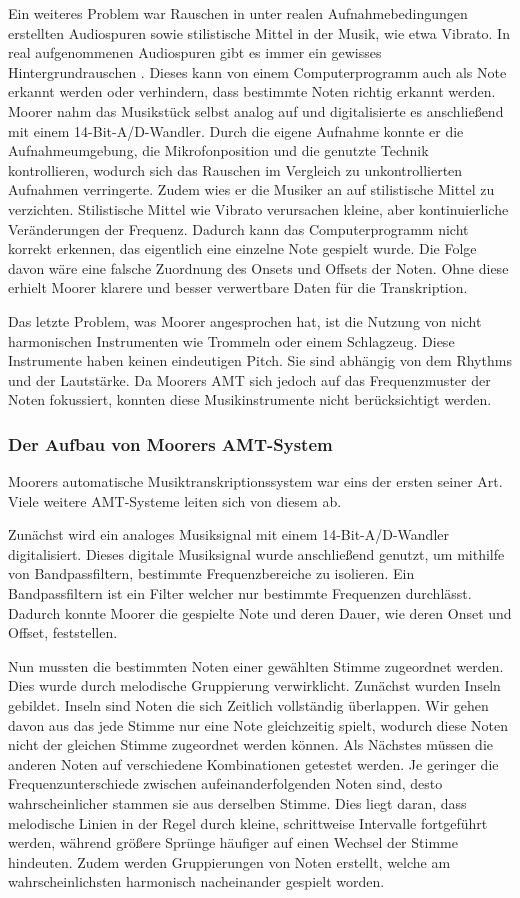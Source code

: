 Ein weiteres Problem war Rauschen in unter realen Aufnahmebedingungen erstellten Audiospuren
sowie stilistische Mittel in der Musik, wie etwa Vibrato.
In real aufgenommenen Audiospuren gibt es immer ein gewisses Hintergrundrauschen \cite{iZotope2025noisefloor}.
Dieses kann von einem Computerprogramm auch als Note erkannt werden oder verhindern,
dass bestimmte Noten richtig erkannt werden.
Moorer nahm das Musikstück selbst analog auf und digitalisierte es anschließend mit einem 14-Bit-A/D-Wandler.
Durch die eigene Aufnahme konnte er die Aufnahmeumgebung, die Mikrofonposition
und die genutzte Technik kontrollieren, wodurch sich das Rauschen im Vergleich zu unkontrollierten Aufnahmen verringerte.
Zudem wies er die Musiker an auf stilistische Mittel zu verzichten.
Stilistische Mittel wie Vibrato verursachen kleine, aber kontinuierliche Veränderungen der Frequenz.
Dadurch kann das Computerprogramm nicht korrekt erkennen, das eigentlich eine einzelne Note gespielt wurde.
Die Folge davon wäre eine falsche Zuordnung des Onsets und Offsets der Noten.
Ohne diese erhielt Moorer klarere und besser verwertbare Daten für die Transkription.

Das letzte Problem, was Moorer angesprochen hat, ist die Nutzung von nicht
harmonischen Instrumenten wie Trommeln oder einem Schlagzeug.
Diese Instrumente haben keinen eindeutigen Pitch.
Sie sind abhängig von dem Rhythms und der Lautstärke.
Da Moorers AMT sich jedoch auf das Frequenzmuster der Noten fokussiert,
konnten diese Musikinstrumente nicht berücksichtigt werden.

\subsubsection{Der Aufbau von Moorers AMT-System}
Moorers automatische Musiktranskriptionssystem war eins der ersten seiner Art.
Viele weitere AMT-Systeme leiten sich von diesem ab.

Zunächst wird ein analoges Musiksignal mit einem 14-Bit-A/D-Wandler digitalisiert.
Dieses digitale Musiksignal wurde anschließend genutzt, um mithilfe von Bandpassfiltern,
bestimmte Frequenzbereiche zu isolieren.
Ein Bandpassfiltern ist ein Filter welcher nur bestimmte Frequenzen durchlässt.
Dadurch konnte Moorer die gespielte Note und deren Dauer,
wie deren Onset und Offset, feststellen.

Nun mussten die bestimmten Noten einer gewählten Stimme zugeordnet werden.
Dies wurde durch melodische Gruppierung verwirklicht.
Zunächst wurden Inseln gebildet.
Inseln sind Noten die sich Zeitlich vollständig überlappen.
Wir gehen davon aus das jede Stimme nur eine Note gleichzeitig spielt,
wodurch diese Noten nicht der gleichen Stimme zugeordnet werden können.
Als Nächstes müssen die anderen Noten auf verschiedene Kombinationen getestet werden.
Je geringer die Frequenzunterschiede zwischen aufeinanderfolgenden Noten sind,
desto wahrscheinlicher stammen sie aus derselben Stimme.
Dies liegt daran, dass melodische Linien in der Regel durch kleine, schrittweise Intervalle fortgeführt werden,
während größere Sprünge häufiger auf einen Wechsel der Stimme hindeuten.
Zudem werden Gruppierungen von Noten erstellt, welche am wahrscheinlichsten harmonisch nacheinander gespielt worden.

